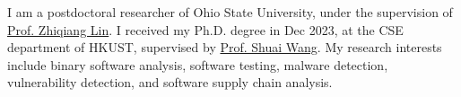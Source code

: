 I am a postdoctoral researcher of Ohio State University, under the supervision of
\href{https://zhiqlin.github.io/}{Prof. Zhiqiang Lin}.
I received my Ph.D. degree in Dec 2023, at the CSE department of HKUST, supervised by
\href{https://www.cse.ust.hk/~shuaiw/}{Prof. Shuai Wang}.
My research interests include binary software analysis, software testing, malware detection, vulnerability detection,
and software supply chain analysis.
